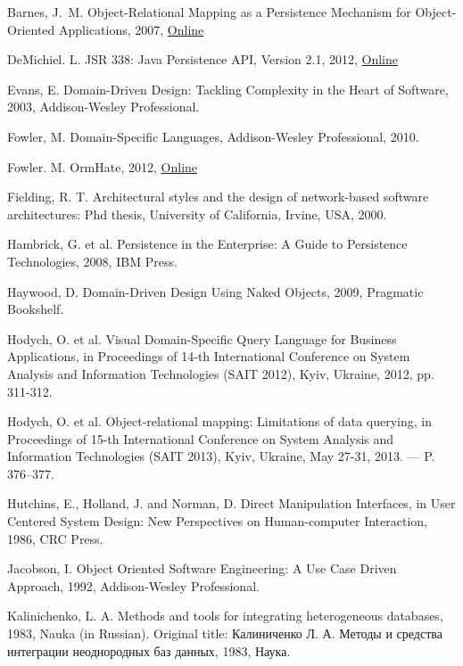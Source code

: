 \documentclass[a4paper,10pt,oneside,openright,final]{memoir} %
\begin{document}
%
%
\begin{thebibliography}{5}

Bar\-nes, J.~M. Object-Relational Mapping as a Persistence Mechanism for Object-Oriented Applications, 2007,
\href{http://digitalcommons.macalester.edu/mathcs_honors/6/}{Online}

De\-Mi\-chiel. L. JSR 338: Java Persistence API, Version 2.1, 2012,
\href{http://jcp.org/aboutJava/communityprocess/pr/jsr338/index.html}{Online}

Evans, E. Domain-Driven Design: Tackling Complexity in the Heart of Software, 2003, Addison-Wesley Professional.

Fow\-ler, M. Domain-Specific Languages, Addison-Wesley Professional, 2010.

Fow\-ler. M. OrmHate, 2012,
\href{http://martinfowler.com/bliki/OrmHate.html}{Online}

Fielding, R. T. Architectural styles and the design of network-based software architectures: Phd thesis, University of California, Irvine, USA, 2000.

Hambrick, G. et al. Persistence in the Enterprise: A Guide to Persistence Technologies, 2008, IBM Press.

Haywood, D. Domain-Driven Design Using Naked Objects, 2009, Pragmatic Bookshelf.

Hodych, O. et al. Visual Domain-Specific Query Language for Business Applications, in Proceedings of 14-th International Conference on System Analysis and Information Technologies (SAIT 2012), Kyiv, Ukraine, 2012, pp. 311-312.

Hodych, O. et al. Object-relational mapping: Limitations of data querying, in Proceedings of 15-th International Conference on System Analysis and Information Technologies (SAIT 2013), Kyiv, Ukraine, May 27-31, 2013. — P. 376–377.

Hutchins, E., Holland, J. and Norman, D. Direct Manipulation Interfaces, in User Centered System Design: New Perspectives on Human-computer Interaction, 1986, CRC Press.

Jacobson, I. Object Oriented Software Engineering: A Use Case Driven Approach, 1992, Addison-Wesley Professional.

Kalinichenko, L. A. Methods and tools for integrating heterogeneous databases, 1983, Nauka (in Russian).
\foreignlanguage{russian}{Original title: Калиниченко Л. А. Методы и средства интеграции неоднородных баз данных, 1983, Наука.}


\end{thebibliography}
\end{document}
